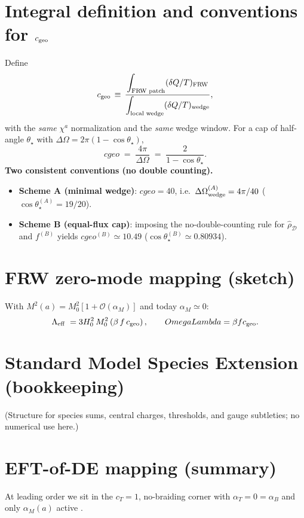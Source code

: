 \documentclass[aps,prd,onecolumn,superscriptaddress,nofootinbib]{revtex4-2}
\def\OmL{OmegaLambda}%
\def\cgeo{cgeo}%
\def\boxed#1{#1}%
\newcommand{\OmL}{\Omega_\Lambda}
\newcommand{\cgeo}{c_{\rm geo}}
\begin{document}
\section{Integral definition and conventions for \texorpdfstring{$c_{\rm geo}$}{cgeo}}
\label{app:cgeo-integral}
Define
\begin{equation}
 c_{\rm geo} \,\equiv\, \frac{\displaystyle \int_{\text{FRW patch}} (\delta Q/T)_{\text{FRW}}}{\displaystyle \int_{\text{local wedge}} (\delta Q/T)_{\text{wedge}}},
 \label{eq:cgeo-def}
\end{equation}
with the \emph{same} \(\chi^a\) normalization and the \emph{same} wedge window.
For a cap of half-angle \(\theta_\star\) with \(\Delta\Omega=2\pi(1-\cos\theta_\star)\),
\begin{equation}
\cgeo \;=\; \frac{4\pi}{\Delta\Omega} \;=\; \frac{2}{1-\cos\theta_\star}.
\end{equation}
\textbf{Two consistent conventions (no double counting).}
\begin{itemize}[leftmargin=1.3em]
\item \textbf{Scheme A (minimal wedge)}: \(\boxed{\cgeo=40}\), i.e.\ \(\Delta\Omega_{\rm wedge}^{(A)}=4\pi/40\) (\(\cos\theta_\star^{(A)}=19/20\)).
\item \textbf{Scheme B (equal-flux cap)}: imposing the no-double-counting rule for \(\hat\rho_{\mathcal D}\) and \(f^{(B)}\) yields \(\boxed{\cgeo^{(B)} \simeq 10.49}\) (\(\cos\theta_\star^{(B)}\simeq 0.80934\)).
\end{itemize}

\section{FRW zero-mode mapping (sketch)}
\label{app:frw-mapping}
With \(M^2(a)=M_0^2[1+\mathcal O(\alpha_M)]\) and today \(\alpha_M\!\simeq\!0\):
\begin{equation}
\Lambda_{\rm eff} \;= 3 H_0^2 \,M_0^2 \,(\beta\, f\, c_{\rm geo})\,,\qquad
\OmL=\beta f c_{\rm geo}.
\end{equation}

\section{Standard Model Species Extension (bookkeeping)}
\label{app:SM}
(Structure for species sums, central charges, thresholds, and gauge subtleties; no numerical use here.)

\section{EFT-of-DE mapping (summary)}
\label{app:eft}
At leading order we sit in the \(c_T=1\), no-braiding corner with \(\alpha_T=0=\alpha_B\) and only \(\alpha_M(a)\) active \cite{BelliniSawicki2014}.
\end{document}
